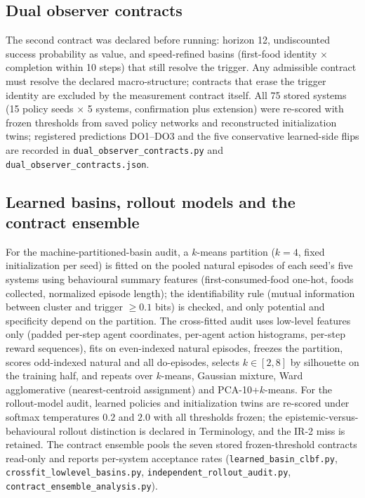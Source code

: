 \documentclass[11pt]{article}
\theoremstyle{definition}
\begin{document}
\subsection*{Dual observer contracts}
The second contract was declared before running: horizon 12,
undiscounted success probability as value, and speed-refined basins
(first-food identity $\times$ completion within 10 steps) that still
resolve the trigger. Any admissible contract must resolve the declared
macro-structure; contracts that erase the trigger identity are
excluded by the measurement contract itself. All 75 stored systems
(15 policy seeds $\times$ 5 systems, confirmation plus extension) were
re-scored with frozen thresholds from saved policy networks and
reconstructed initialization twins; registered predictions DO1--DO3
and the five conservative learned-side flips are recorded in
\texttt{dual\_observer\_contracts.py} and
\texttt{dual\_observer\_contracts.json}.

\subsection*{Learned basins, rollout models and the contract ensemble}
For the machine-partitioned-basin audit, a $k$-means partition ($k=4$,
fixed initialization per seed) is fitted on the pooled natural
episodes of each seed's five systems using behavioural summary
features (first-consumed-food one-hot, foods collected, normalized
episode length); the identifiability rule (mutual information between
cluster and trigger $\ge0.1$ bits) is checked, and only potential and
specificity depend on the partition. The cross-fitted audit uses
low-level features only (padded per-step agent coordinates, per-agent
action histograms, per-step reward sequences), fits on even-indexed
natural episodes, freezes the partition, scores odd-indexed natural
and all do-episodes, selects $k\in[2,8]$ by silhouette on the training
half, and repeats over $k$-means, Gaussian mixture, Ward agglomerative
(nearest-centroid assignment) and PCA-10+$k$-means. For the
rollout-model audit, learned policies and initialization twins are
re-scored under softmax temperatures $0.2$ and $2.0$ with all
thresholds frozen; the epistemic-versus-behavioural rollout
distinction is declared in Terminology, and the IR-2 miss is retained.
The contract ensemble pools the seven stored frozen-threshold
contracts read-only and reports per-system acceptance rates
(\texttt{learned\_basin\_clbf.py},
\texttt{crossfit\_lowlevel\_basins.py},
\texttt{independent\_rollout\_audit.py},
\texttt{contract\_ensemble\_analysis.py}).
\end{document}

